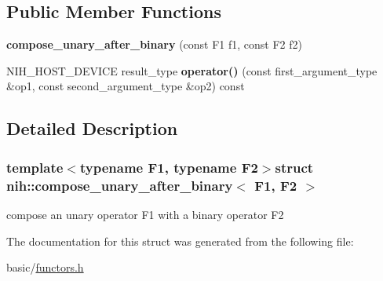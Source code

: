 \subsection*{\-Public \-Member \-Functions}
\begin{DoxyCompactItemize}
\item 
\hypertarget{structnih_1_1compose__unary__after__binary_a8bdc589f4c04a452d1dd360f151c411c}{
{\bfseries compose\-\_\-unary\-\_\-after\-\_\-binary} (const \-F1 f1, const \-F2 f2)}
\label{structnih_1_1compose__unary__after__binary_a8bdc589f4c04a452d1dd360f151c411c}

\item 
\hypertarget{structnih_1_1compose__unary__after__binary_a2540b806addadf1811a52b8f97590ed2}{
\-N\-I\-H\-\_\-\-H\-O\-S\-T\-\_\-\-D\-E\-V\-I\-C\-E result\-\_\-type {\bfseries operator()} (const first\-\_\-argument\-\_\-type \&op1, const second\-\_\-argument\-\_\-type \&op2) const }
\label{structnih_1_1compose__unary__after__binary_a2540b806addadf1811a52b8f97590ed2}

\end{DoxyCompactItemize}


\subsection{\-Detailed \-Description}
\subsubsection*{template$<$typename F1, typename F2$>$struct nih\-::compose\-\_\-unary\-\_\-after\-\_\-binary$<$ F1, F2 $>$}

compose an unary operator \-F1 with a binary operator \-F2 

\-The documentation for this struct was generated from the following file\-:\begin{DoxyCompactItemize}
\item 
basic/\hyperlink{functors_8h}{functors.\-h}\end{DoxyCompactItemize}
